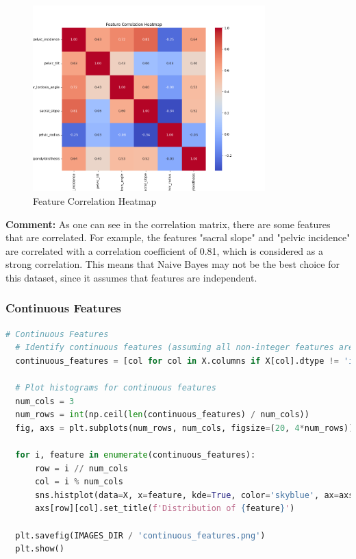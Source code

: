 \documentclass{article}
\begin{document}
  \begin{figure}[H]
    \centering
    \includegraphics[width=0.8\textwidth]{images/correlation_heatmap.png}
    \caption{Feature Correlation Heatmap}
    \label{fig:correlation_heatmap}
  \end{figure}

  \textbf{Comment:}
  As one can see in the correlation matrix, there are some features that are correlated.
  For example, the features "sacral slope" and "pelvic incidence" are correlated with a correlation coefficient of 0.81,
  which is considered as a strong correlation. This means that Naive Bayes may not be the best choice for this dataset,
  since it assumes that features are independent.

\subsubsection*{Continuous Features}

\begin{lstlisting}[language=Python]
  # Continuous Features
  # Identify continuous features (assuming all non-integer features are continuous)
  continuous_features = [col for col in X.columns if X[col].dtype != 'int64']

  # Plot histograms for continuous features
  num_cols = 3
  num_rows = int(np.ceil(len(continuous_features) / num_cols))
  fig, axs = plt.subplots(num_rows, num_cols, figsize=(20, 4*num_rows))

  for i, feature in enumerate(continuous_features):
      row = i // num_cols
      col = i % num_cols
      sns.histplot(data=X, x=feature, kde=True, color='skyblue', ax=axs[row][col])
      axs[row][col].set_title(f'Distribution of {feature}')

  plt.savefig(IMAGES_DIR / 'continuous_features.png')
  plt.show()
\end{lstlisting}
\end{document}
